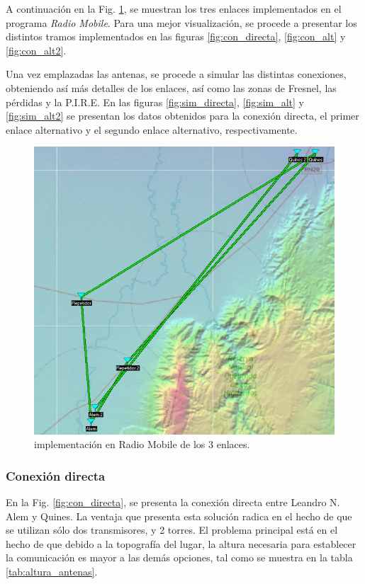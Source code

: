\documentclass[11pt,a4paper]{article}
\begin{document}
A continuación en la Fig. \ref{fig:enlaces_radiom}, se muestran los tres enlaces implementados en el programa \textit{Radio Mobile}. 
Para una mejor visualización, se procede a presentar los distintos tramos implementados en las figuras \ref{fig:con_directa}, \ref{fig:con_alt} y \ref{fig:con_alt2}.

Una vez emplazadas las antenas, se procede a simular las distintas conexiones, obteniendo así más detalles de los enlaces, así como las zonas de Fresnel, las pérdidas y la P.I.R.E. En las figuras \ref{fig:sim_directa}, \ref{fig:sim_alt} y \ref{fig:sim_alt2} se presentan los datos obtenidos para la conexión directa, el primer enlace alternativo y el segundo enlace alternativo, respectivamente. 


\begin{figure}[htbp]
  \centering
  \includegraphics[width=\linewidth]{fotos_ema/imp_radio_mobile.jpg}
  \caption{implementación en Radio Mobile de los 3 enlaces.}
  \label{fig:enlaces_radiom}
\end{figure}
\clearpage
\subsubsection{Conexión directa}

En la Fig. \ref{fig:con_directa}, se presenta la conexión directa entre Leandro N. Alem y Quines.
La ventaja que presenta esta solución radica en el hecho de que se utilizan sólo dos transmisores, y 2 torres. El problema principal está en el hecho de que debido a la topografía del lugar, la altura necesaria para establecer la comunicación es mayor a las demás opciones, tal como se muestra en la tabla \ref{tab:altura_antenas}.
\end{document}
